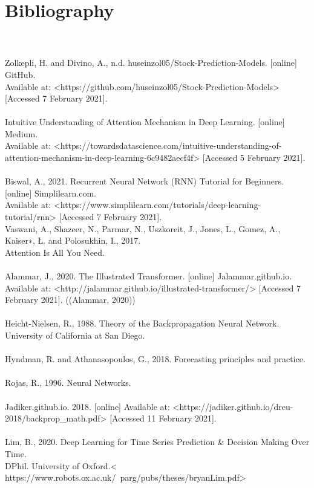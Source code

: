 \documentclass{article}
\begin{document}
\section{Bibliography}
\\
\\
Zolkepli, H. and Divino, A., n.d. huseinzol05/Stock-Prediction-Models. [online] GitHub.\\ Available at: <https://github.com/huseinzol05/Stock-Prediction-Models> [Accessed 7 February 2021].
\\
\\Intuitive Understanding of Attention Mechanism in Deep Learning. [online] Medium. \\Available at: <https://towardsdatascience.com/intuitive-understanding-of-attention-mechanism-in-deep-learning-6c9482aecf4f> [Accessed 5 February 2021].
\\
\\
Biswal, A., 2021. Recurrent Neural Network (RNN) Tutorial for Beginners. [online] Simplilearn.com.\\ Available at: <https://www.simplilearn.com/tutorials/deep-learning-tutorial/rnn> [Accessed 7 February 2021].
\\
Vaswani, A., Shazeer, N., Parmar, N., Uszkoreit, J., Jones, L., Gomez, A., Kaiser∗, Ł. and Polosukhin, I., 2017.\\ Attention Is All You Need.
\\
\\
Alammar, J., 2020. The Illustrated Transformer. [online] Jalammar.github.io.\\ Available at: <http://jalammar.github.io/illustrated-transformer/> [Accessed 7 February 2021].
((Alammar, 2020))
\\
\\Heicht-Nielsen, R., 1988. Theory of the Backpropagation Neural Network. University of California at San Diego.
\\\\
Hyndman, R. and Athanasopoulos, G., 2018. Forecasting principles and practice.
\\\\
Rojas, R., 1996. Neural Networks.
\\\\
Jadiker.github.io. 2018. [online] Available at: <https://jadiker.github.io/dreu-2018/backprop_math.pdf> [Accessed 11 February 2021].
\\\\
Lim, B., 2020. Deep Learning for Time Series Prediction \& Decision Making Over Time.\\ DPhil. University of Oxford.< https://www.robots.ox.ac.uk/~parg/pubs/theses/bryanLim.pdf>
\end{document}
